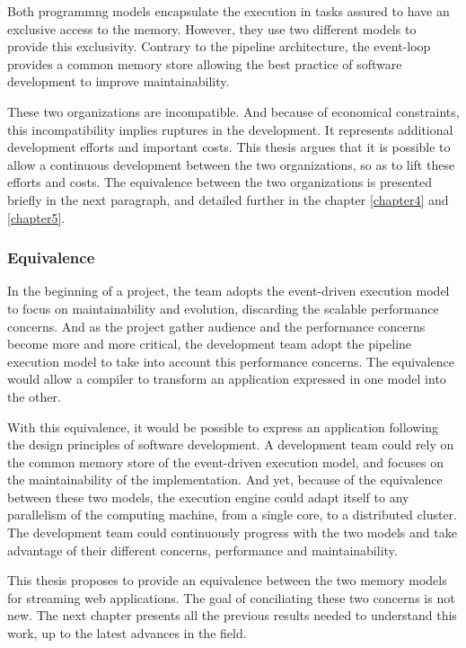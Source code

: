 Both programmng models encapsulate the execution in tasks assured to have an exclusive access to the memory.
However, they use two different models to provide this exclusivity.
Contrary to the pipeline architecture, the event-loop provides a common memory store allowing the best practice of software development to improve maintainability.

These two organizations are incompatible.
And because of economical constraints, this incompatibility implies ruptures in the development.
It represents additional development efforts and important costs.
This thesis argues that it is possible to allow a continuous development between the two organizations, so as to lift these efforts and costs.
The equivalence between the two organizations is presented briefly in the next paragraph, and detailed further in the chapter \ref{chapter4} and \ref{chapter5}.

\subsubsection{Equivalence}

In the beginning of a project, the team adopts the event-driven execution model to focus on maintainability and evolution, discarding the scalable performance concerns.
And as the project gather audience and the performance concerns become more and more critical, the development team adopt the pipeline execution model to take into account this performance concerns.
The equivalence would allow a compiler to transform an application expressed in one model into the other.

With this equivalence, it would be possible to express an application following the design principles of software development.
A development team could rely on the common memory store of the event-driven execution model, and focuses on the maintainability of the implementation.
And yet, because of the equivalence between these two models, the execution engine could adapt itself to any parallelism of the computing machine, from a single core, to a distributed cluster.
The development team could continuously progress with the two models and take advantage of their different concerns, performance and maintainability.

\separator

This thesis proposes to provide an equivalence between the two memory models for streaming web applications.
The goal of conciliating these two concerns is not new.
The next chapter presents all the previous results needed to understand this work, up to the latest advances in the field.